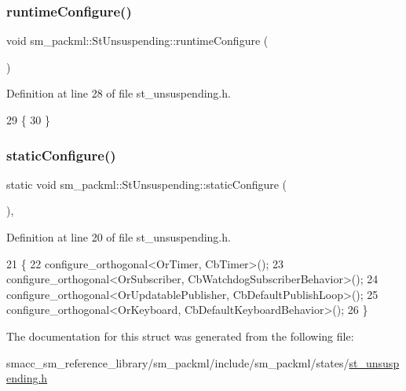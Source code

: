 \subsubsection{\texorpdfstring{runtime\+Configure()}{runtimeConfigure()}}
{\footnotesize\ttfamily void sm\+\_\+packml\+::\+St\+Unsuspending\+::runtime\+Configure (\begin{DoxyParamCaption}{ }\end{DoxyParamCaption})\hspace{0.3cm}{\ttfamily [inline]}}



Definition at line 28 of file st\+\_\+unsuspending.\+h.


\begin{DoxyCode}
29     \{
30     \}
\end{DoxyCode}
\mbox{\label{structsm__packml_1_1StUnsuspending_a43b80d56cb694840d8ef946f11b91edb}} 
\subsubsection{\texorpdfstring{static\+Configure()}{staticConfigure()}}
{\footnotesize\ttfamily static void sm\+\_\+packml\+::\+St\+Unsuspending\+::static\+Configure (\begin{DoxyParamCaption}{ }\end{DoxyParamCaption})\hspace{0.3cm}{\ttfamily [inline]}, {\ttfamily [static]}}



Definition at line 20 of file st\+\_\+unsuspending.\+h.


\begin{DoxyCode}
21     \{
22         configure\_orthogonal<OrTimer, CbTimer>();   
23         configure\_orthogonal<OrSubscriber, CbWatchdogSubscriberBehavior>();
24         configure\_orthogonal<OrUpdatablePublisher, CbDefaultPublishLoop>();
25         configure\_orthogonal<OrKeyboard, CbDefaultKeyboardBehavior>();
26     \}
\end{DoxyCode}


The documentation for this struct was generated from the following file\+:\begin{DoxyCompactItemize}
\item 
smacc\+\_\+sm\+\_\+reference\+\_\+library/sm\+\_\+packml/include/sm\+\_\+packml/states/\hyperlink{st__unsuspending_8h}{st\+\_\+unsuspending.\+h}\end{DoxyCompactItemize}
